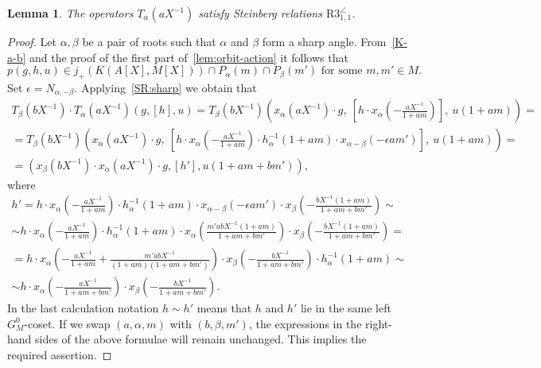 \documentclass[oneside, 8pt]{amsart}
\newtheorem{lemma}{Lemma}
\theoremstyle{remark}
\theoremstyle{definition}
\numberwithin{lemma}{section}
\numberwithin{prop}{section}
\numberwithin{corollary}{section}
\numberwithin{externaltheorem}{section}
\numberwithin{equation}{section}
\begin{document}
\begin{lemma} \label{R3_1_1} The operators $T_\alpha(aX^{-1})$ satisfy Steinberg relations $\mathrm{R3}_{1,1}^{\angle}$. \end{lemma}
\begin{proof}
Let $\alpha, \beta$ be a pair of roots such that $\alpha$ and $\beta$ form a sharp angle.
From~\cref{K-a-b} and the proof of the first part of~\cref{lem:orbit-action} it follows that \[p(g, h, u) \in j_+\left(K(A[X], M[X])\right) \cap P_\alpha(m) \cap P_{\beta}(m')\text{ for some }m,m' \in M.\]
Set $\epsilon = N_{\alpha,-\beta}$. Applying~\cref{SR:sharp} we obtain that
\begin{multline} \nonumber
 T_\beta(bX^{-1}) \cdot T_\alpha(aX^{-1}) \left(g, [h], u\right) = 
 T_\beta(bX^{-1}) \left(x_\alpha(aX^{-1})\cdot g,\ \left[h \cdot x_\alpha\left(-\tfrac{aX^{-1}}{1 + am}\right)\right],\ u(1 + am)\right) = \\ 
 = T_\beta(bX^{-1}) \left(x_\alpha(aX^{-1})\cdot g,\ \left[h \cdot x_\alpha\left(-\tfrac{aX^{-1}}{1 + am}\right) \cdot h^{-1}_\alpha(1 + am) \cdot x_{\alpha-\beta}(-\epsilon am')\right],\ u(1 + am)\right) = \\
 = (x_\beta(bX^{-1}) \cdot x_\alpha(aX^{-1}) \cdot g, [h'], u(1 + am + bm')), \end{multline}
where 
\begin{multline} \nonumber
 h' = h \cdot x_\alpha\left(-\tfrac{aX^{-1}}{1 + am}\right) \cdot h^{-1}_\alpha(1 + am) \cdot x_{\alpha-\beta}(-\epsilon am') \cdot x_\beta\left(-\tfrac{bX^{-1}(1+am)}{1 + am + bm'}\right) \sim \\
    \sim h \cdot x_\alpha\left(-\tfrac{aX^{-1}}{1 + am}\right) \cdot h^{-1}_\alpha(1 + am) \cdot x_{\alpha}\left(\tfrac{m'abX^{-1}(1+am)}{1 + am + bm'}\right) \cdot x_\beta\left(-\tfrac{bX^{-1}(1+am)}{1 + am + bm'}\right) = \\
 = h \cdot x_\alpha\left(-\tfrac{aX^{-1}}{1 + am} + \tfrac{m'abX^{-1}}{(1+am)(1 + am + bm')}\right) \cdot x_\beta\left(-\tfrac{bX^{-1}}{1 + am + bm'}\right) \cdot h^{-1}_\alpha(1 + am) \sim \\
 \sim h \cdot x_\alpha\left(-\tfrac{aX^{-1}}{1 + am + bm'}\right) \cdot x_\beta\left(-\tfrac{bX^{-1}}{1 + am + bm'}\right).
\end{multline}
In the last calculation notation $h \sim h'$ means that $h$ and $h'$ lie in the same left $G_M^0$-coset.
If we swap $(a,\alpha,m)$ with $(b,\beta,m')$, the expressions in the right-hand sides of the above formulae will remain unchanged. This implies the required assertion.
\end{proof}
\end{document}
